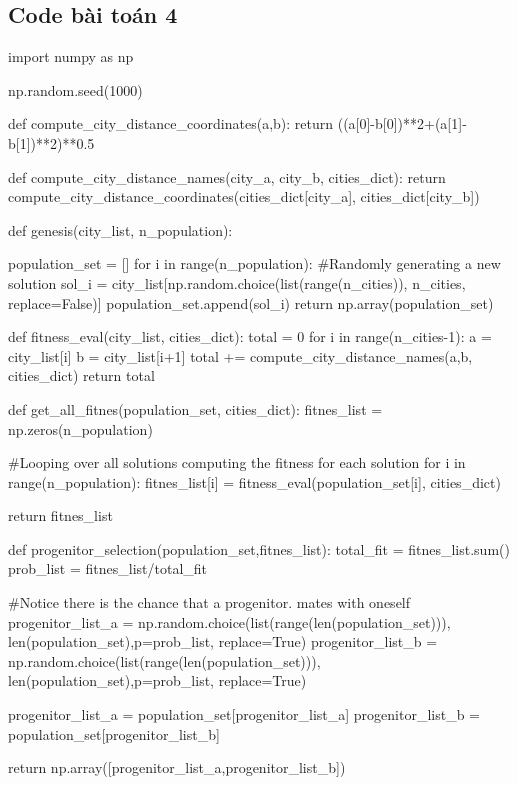 \documentclass[14pt, a4paper]{article}
\theoremstyle{sltheorem}
\theoremstyle{soltheorem}
\begin{document}
\subsection{Code bài toán 4} \label{code-4-ex-3}

\begin{python}
import numpy as np

np.random.seed(1000)
    
    
def compute_city_distance_coordinates(a,b):
    return ((a[0]-b[0])**2+(a[1]-b[1])**2)**0.5

def compute_city_distance_names(city_a, city_b, cities_dict):
    return compute_city_distance_coordinates(cities_dict[city_a], cities_dict[city_b])

def genesis(city_list, n_population):

    population_set = []
    for i in range(n_population):
        #Randomly generating a new solution
        sol_i = city_list[np.random.choice(list(range(n_cities)), n_cities, replace=False)]
        population_set.append(sol_i)
    return np.array(population_set)


def fitness_eval(city_list, cities_dict):
    total = 0
    for i in range(n_cities-1):
        a = city_list[i]
        b = city_list[i+1]
        total += compute_city_distance_names(a,b, cities_dict)
    return total


def get_all_fitnes(population_set, cities_dict):
    fitnes_list = np.zeros(n_population)

    #Looping over all solutions computing the fitness for each solution
    for i in  range(n_population):
        fitnes_list[i] = fitness_eval(population_set[i], cities_dict)

    return fitnes_list



def progenitor_selection(population_set,fitnes_list):
    total_fit = fitnes_list.sum()
    prob_list = fitnes_list/total_fit
    
    #Notice there is the chance that a progenitor. mates with oneself
    progenitor_list_a = np.random.choice(list(range(len(population_set))), len(population_set),p=prob_list, replace=True)
    progenitor_list_b = np.random.choice(list(range(len(population_set))), len(population_set),p=prob_list, replace=True)
    
    progenitor_list_a = population_set[progenitor_list_a]
    progenitor_list_b = population_set[progenitor_list_b]
    
    
    return np.array([progenitor_list_a,progenitor_list_b])



\end{python}
\end{document}
